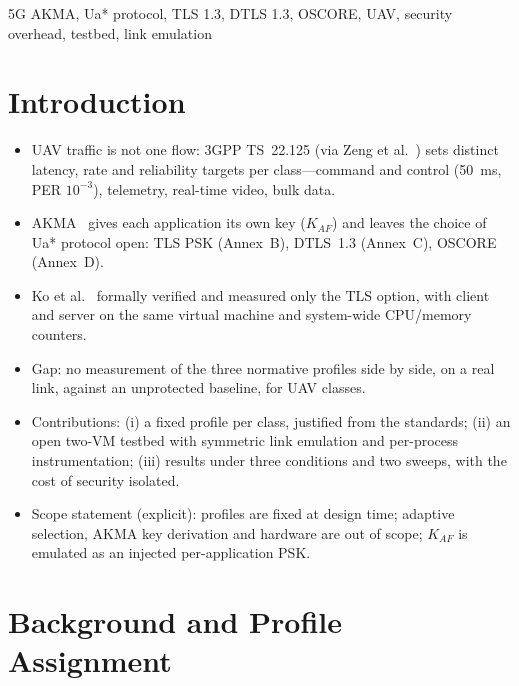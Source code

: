 \documentclass[conference]{IEEEtran}
\begin{document}
\begin{IEEEkeywords}
5G AKMA, Ua* protocol, TLS 1.3, DTLS 1.3, OSCORE, UAV, security overhead,
testbed, link emulation
\end{IEEEkeywords}

\section{Introduction}
\label{sec:intro}

\begin{itemize}
  \item UAV traffic is not one flow: 3GPP TS~22.125 (via Zeng et
        al.~\cite{zeng2019}) sets distinct latency, rate and reliability
        targets per class---command and control (50~ms, PER $10^{-3}$),
        telemetry, real-time video, bulk data.
  \item AKMA~\cite{ts33535} gives each application its own key
        ($K_{AF}$) and leaves the choice of Ua* protocol open: TLS PSK
        (Annex~B), DTLS~1.3 (Annex~C), OSCORE (Annex~D).
  \item Ko et al.~\cite{ko2024} formally verified and measured only the TLS
        option, with client and server on the same virtual machine and
        system-wide CPU/memory counters.
  \item Gap: no measurement of the three normative profiles side by side,
        on a real link, against an unprotected baseline, for UAV classes.
  \item Contributions: (i) a fixed profile per class, justified from the
        standards; (ii) an open two-VM testbed with symmetric link emulation
        and per-process instrumentation; (iii) results under three
        conditions and two sweeps, with the cost of security isolated.
  \item Scope statement (explicit): profiles are fixed at design time;
        adaptive selection, AKMA key derivation and hardware are out of
        scope; $K_{AF}$ is emulated as an injected per-application PSK.
\end{itemize}

\section{Background and Profile Assignment}
\label{sec:profiles}
\end{document}
